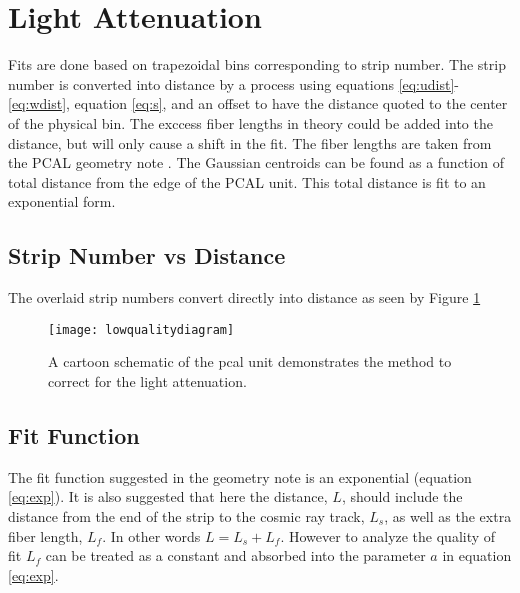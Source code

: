 \section{Light Attenuation}
Fits are done based on trapezoidal bins corresponding to strip number. 
The strip number is converted into distance by a process using equations \ref{eq:udist}-\ref{eq:wdist}, equation \ref{eq:s}, and an offset to have the distance quoted to the center of the physical bin. 
The exccess fiber lengths in theory could be added into the distance, but will only cause a shift in the fit.
The fiber lengths are taken from the PCAL geometry note \cite{bib:geomnote}. 
The Gaussian centroids can be found as a function of total distance from the edge of the PCAL unit.
This total distance is fit to an exponential form. 




\subsection{Strip Number vs Distance}
\FloatBarrier

The overlaid strip numbers convert directly into distance as seen by Figure \ref{fig:lowqualdist}

\begin{figure}[h]
\centering
\texttt{[image: lowqualitydiagram]}
\caption{A cartoon schematic of the pcal unit demonstrates the method to correct for the light attenuation.}
\label{fig:lowqualdist}
\end{figure}





\FloatBarrier
\subsection{Fit Function}
\FloatBarrier
The fit function suggested in the geometry note is an  exponential (equation \ref{eq:exp}).
It is also suggested that here the distance, $L$, should include the distance from the end of the strip to the cosmic ray track, $L_{s}$, as well as the extra fiber length, $L_{f}$.
In other words $L = L_{s} + L_{f}$.
However to analyze the quality of fit $L_{f}$ can be treated as a constant and absorbed into the parameter $a$ in equation \ref{eq:exp}.

